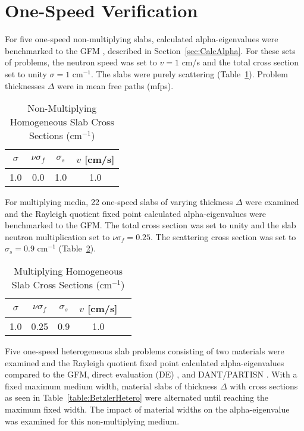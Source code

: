 \section{One-Speed Verification}

For five one-speed non-multiplying slabs, calculated alpha-eigenvalues were benchmarked to the GFM \cite{kornreich_timeeigenvalue_2005}, described in Section~\ref{sec:CalcAlpha}. For these sets of problems, the neutron speed was set to $v = 1$ cm/s and the total cross section set to unity $\sigma = 1$ cm$^{-1}$. The slabs were purely scattering (Table~\ref{table:Betzler}). Problem thicknesses $\Delta$ were in mean free paths (mfps).

\begin{table}[H]
    \centering
    \caption{Non-Multiplying Homogeneous Slab Cross Sections (cm$^{-1}$)}
\label{table:Betzler}
    \begin{tabular}{*4c}
        \toprule
	$\sigma$ & $\nu \sigma_{f}$ & $\sigma_{s}$  & $v$ [cm/s] \\ 
        \midrule
	1.0 & 0.0 & 1.0 & 1.0 \\
        \bottomrule
    \end{tabular}
\end{table}

For multiplying media, 22 one-speed slabs of varying thickness $\Delta$ were examined and the Rayleigh quotient fixed point calculated alpha-eigenvalues were benchmarked to the GFM. The total cross section was set to unity and the slab neutron multiplication set to $\nu \sigma_{f} = 0.25$. The scattering cross section was set to $\sigma_{s} = 0.9$ cm$^{-1}$ (Table~\ref{table:Betzler2}).

\begin{table}[H]
    \centering
    \caption{Multiplying Homogeneous Slab Cross Sections (cm$^{-1}$)}
\label{table:Betzler2}
    \begin{tabular}{*5c}
        \toprule
	$\sigma$ & $\nu \sigma_{f}$ & $\sigma_{s}$ & $v$ [cm/s] \\ 
        \midrule
	1.0 & 0.25 & 0.9 & 1.0 \\
        \bottomrule
    \end{tabular}
\end{table}

Five one-speed heterogeneous slab problems consisting of two materials were examined and the Rayleigh quotient fixed point calculated alpha-eigenvalues compared to the GFM, direct evaluation (DE) \cite{modak_simple_2003}, and DANT/PARTISN \cite{alcouffe2005partisn}. With a fixed maximum medium width, material slabs of thickness $\Delta$ with cross sections as seen in Table~\ref{table:BetzlerHetero} were alternated until reaching the maximum fixed width. The impact of material widths on the alpha-eigenvalue was examined for this non-multiplying medium.

